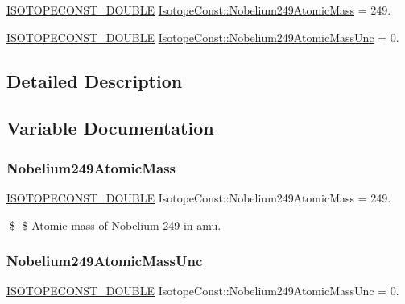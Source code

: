 \begin{DoxyCompactItemize}
\item 
\mbox{\hyperlink{group___isotope_const-_macros_ga8f45a7272ce02c0b4c65c44636ed719a}{I\+S\+O\+T\+O\+P\+E\+C\+O\+N\+S\+T\+\_\+\+D\+O\+U\+B\+LE}} \mbox{\hyperlink{group___isotope_const-_nobelium-_no249_gaf2928a8e4b84fc6a896c0422dbbf4520}{Isotope\+Const\+::\+Nobelium249\+Atomic\+Mass}} = 249.
\item 
\mbox{\hyperlink{group___isotope_const-_macros_ga8f45a7272ce02c0b4c65c44636ed719a}{I\+S\+O\+T\+O\+P\+E\+C\+O\+N\+S\+T\+\_\+\+D\+O\+U\+B\+LE}} \mbox{\hyperlink{group___isotope_const-_nobelium-_no249_ga1ad4a21a38b995e1127fb092cfed06c8}{Isotope\+Const\+::\+Nobelium249\+Atomic\+Mass\+Unc}} = 0.
\end{DoxyCompactItemize}


\subsection{Detailed Description}


\subsection{Variable Documentation}
\mbox{\label{group___isotope_const-_nobelium-_no249_gaf2928a8e4b84fc6a896c0422dbbf4520}} 
\subsubsection{\texorpdfstring{Nobelium249\+Atomic\+Mass}{Nobelium249AtomicMass}}
{\footnotesize\ttfamily \mbox{\hyperlink{group___isotope_const-_macros_ga8f45a7272ce02c0b4c65c44636ed719a}{I\+S\+O\+T\+O\+P\+E\+C\+O\+N\+S\+T\+\_\+\+D\+O\+U\+B\+LE}} Isotope\+Const\+::\+Nobelium249\+Atomic\+Mass = 249.}

\$ \$ Atomic mass of Nobelium-\/249 in amu. \mbox{\label{group___isotope_const-_nobelium-_no249_ga1ad4a21a38b995e1127fb092cfed06c8}} 
\subsubsection{\texorpdfstring{Nobelium249\+Atomic\+Mass\+Unc}{Nobelium249AtomicMassUnc}}
{\footnotesize\ttfamily \mbox{\hyperlink{group___isotope_const-_macros_ga8f45a7272ce02c0b4c65c44636ed719a}{I\+S\+O\+T\+O\+P\+E\+C\+O\+N\+S\+T\+\_\+\+D\+O\+U\+B\+LE}} Isotope\+Const\+::\+Nobelium249\+Atomic\+Mass\+Unc = 0.}

